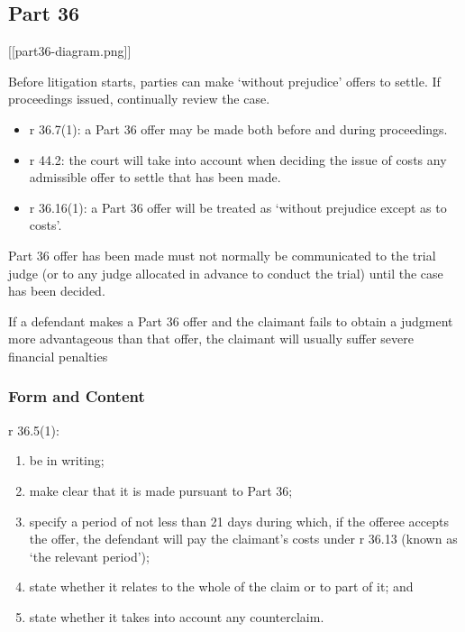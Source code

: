 \documentclass[
]{article}
\newenvironment{Shaded}{}{}
\newcommand{\NormalTok}[1]{#1}
\providecommand{\tightlist}{%
  \setlength{\itemsep}{0pt}\setlength{\parskip}{0pt}}
\begin{document}
\hypertarget{part-36}{%
\subsection{Part 36}\label{part-36}}

{[}{[}part36-diagram.png{]}{]}

Before litigation starts, parties can make `without prejudice' offers to
settle. If proceedings issued, continually review the case.

\begin{itemize}
\tightlist
\item
  r 36.7(1): a Part 36 offer may be made both before and during
  proceedings.
\item
  r 44.2: the court will take into account when deciding the issue of
  costs any admissible offer to settle that has been made.
\item
  r 36.16(1): a Part 36 offer will be treated as `without prejudice
  except as to costs'.
\end{itemize}

Part 36 offer has been made must not normally be communicated to the
trial judge (or to any judge allocated in advance to conduct the trial)
until the case has been decided.

\begin{Shaded}
\begin{Highlighting}[]
\NormalTok{If a defendant makes a Part 36 offer and the claimant fails to obtain a judgment more advantageous than that offer, the claimant will usually suffer severe financial penalties}
\end{Highlighting}
\end{Shaded}

\hypertarget{form-and-content}{%
\subsubsection{Form and Content}\label{form-and-content}}

r 36.5(1):

\begin{enumerate}
\def\labelenumi{\arabic{enumi}.}
\tightlist
\item
  be in writing;
\item
  make clear that it is made pursuant to Part 36;
\item
  specify a period of not less than 21 days during which, if the offeree
  accepts the offer, the defendant will pay the claimant's costs under r
  36.13 (known as `the relevant period');
\item
  state whether it relates to the whole of the claim or to part of it;
  and
\item
  state whether it takes into account any counterclaim.
\end{enumerate}
\end{document}
